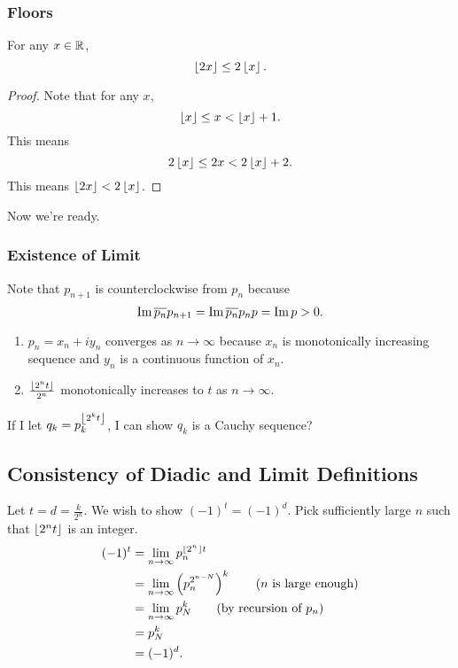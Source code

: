 \subsubsection{Floors}
\begin{theorem}
    For any $x \in \operatorname{\mathbb{R}}$,
    \[ \left \lfloor{2x}\right \rfloor \le 2\left \lfloor{x}\right \rfloor. \]
\end{theorem}

\begin{proof}
    Note that for any $x$,
    \[ \left \lfloor{x}\right \rfloor \le x < \left \lfloor{x}\right \rfloor + 1. \]
    This means 
    \[ 2\left \lfloor{x}\right \rfloor \le 2x < 2\left \lfloor{x}\right \rfloor + 2. \]
    This means $\left \lfloor{2x}\right \rfloor < 2\left \lfloor{x}\right \rfloor$.
\end{proof}

Now we're ready.

\subsubsection{Existence of Limit}




Note that $p_{n+1}$ is counterclockwise from $p_n$ because
\[ \operatorname{Im}{\overline{p_n}p_{n+1}} = \operatorname{Im}{\overline{p_n}
p_np} = \operatorname{Im}{p} > 0. \]



\begin{enumerate}
    \item $p_n = x_n + iy_n$ converges as $n \to \infty$
        because $x_n$ is monotonically increasing sequence
        and $y_n$ is a continuous function of $x_n$.

    \item $\frac{\left \lfloor{2^nt}\right \rfloor}{2^n}$ monotonically increases
        to $t$ as $n \to \infty$.
\end{enumerate}

If I let $q_k = p_k^{\left \lfloor{2^kt}\right \rfloor}$, I can show $q_k$ is
a Cauchy sequence?


\subsection{Consistency of Diadic and Limit Definitions}

Let $t = d = \frac{k}{2^n}$.
We wish to show $(-1)^t = (-1)^d$.
Pick sufficiently large $n$ such that $\left \lfloor{2^n t}\right \rfloor$ is
an integer.
\begin{align*}
    (-1)^t &= \lim_{n \to \infty} p_n^{\left \lfloor{2^n}\right \rfloor t} \\
    &= \lim_{n \to \infty} \left( p_n^{2^{n-N}} \right)^k 
    \tag{$n$ is large enough}\\
    &= \lim_{n \to \infty} p_N^k 
    \tag{by recursion of $p_n$}\\
    &= p_N^k \\
    &= (-1)^d.
\end{align*}

